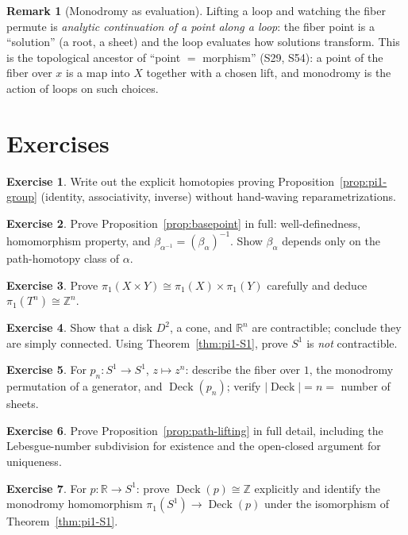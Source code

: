 \documentclass[11pt,a4paper]{article}
\theoremstyle{definition}
\newtheorem{remark}[theorem]{Remark}
\newtheorem{exercise}{Exercise}
\newcommand{\Z}{\mathbb{Z}}
\newcommand{\R}{\mathbb{R}}
\newcommand{\Deck}{\operatorname{Deck}}
\begin{document}
	\begin{remark}[Monodromy as evaluation]
		Lifting a loop and watching the fiber permute is \emph{analytic continuation of a point along a
			loop}: the fiber point is a ``solution'' (a root, a sheet) and the loop evaluates how solutions
		transform. This is the topological ancestor of ``point $=$ morphism'' (S29, S54): a point of the
		fiber over $x$ is a map into $X$ together with a chosen lift, and monodromy is the action of loops
		on such choices.
	\end{remark}
	
	\section{Exercises}
	\begin{exercise}
		Write out the explicit homotopies proving Proposition~\ref{prop:pi1-group} (identity, associativity,
		inverse) without hand-waving reparametrizations.
	\end{exercise}
	\begin{exercise}
		Prove Proposition~\ref{prop:basepoint} in full: well-definedness, homomorphism property, and
		$\beta_{\alpha^{-1}}=(\beta_\alpha)^{-1}$. Show $\beta_\alpha$ depends only on the path-homotopy
		class of $\alpha$.
	\end{exercise}
	\begin{exercise}
		Prove $\pi_1(X\times Y)\cong\pi_1(X)\times\pi_1(Y)$ carefully and deduce $\pi_1(T^n)\cong\Z^n$.
	\end{exercise}
	\begin{exercise}
		Show that a disk $D^2$, a cone, and $\R^n$ are contractible; conclude they are simply connected.
		Using Theorem~\ref{thm:pi1-S1}, prove $S^1$ is \emph{not} contractible.
	\end{exercise}
	\begin{exercise}
		For $p_n:S^1\to S^1$, $z\mapsto z^n$: describe the fiber over $1$, the monodromy permutation of a
		generator, and $\Deck(p_n)$; verify $|\Deck|=n=$ number of sheets.
	\end{exercise}
	\begin{exercise}
		Prove Proposition~\ref{prop:path-lifting} in full detail, including the Lebesgue-number subdivision
		for existence and the open-closed argument for uniqueness.
	\end{exercise}
	\begin{exercise}
		For $p:\R\to S^1$: prove $\Deck(p)\cong\Z$ explicitly and identify the monodromy homomorphism
		$\pi_1(S^1)\to\Deck(p)$ under the isomorphism of Theorem~\ref{thm:pi1-S1}.
	\end{exercise}
\end{document}
